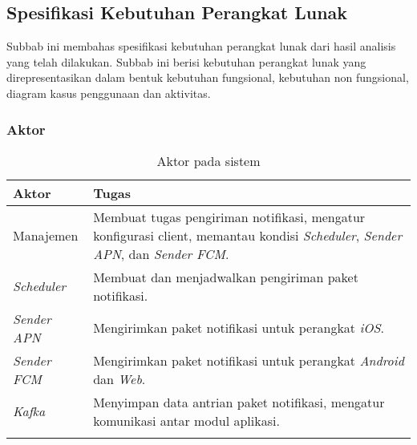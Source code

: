     \subsection{Spesifikasi Kebutuhan Perangkat Lunak}
    Subbab ini membahas spesifikasi kebutuhan perangkat lunak dari hasil analisis yang telah dilakukan. Subbab ini berisi kebutuhan perangkat lunak yang direpresentasikan dalam bentuk kebutuhan fungsional, kebutuhan non fungsional, diagram kasus penggunaan dan aktivitas.

        \subsubsection{Aktor}
        \begin{longtable}{|p{2cm}|p{6cm}|}
            \hline
            \textbf{Aktor} & \textbf{Tugas} \\
            \hline
            Manajemen &
            Membuat tugas pengiriman notifikasi, mengatur konfigurasi client, memantau kondisi \textit{Scheduler}, \textit{Sender APN}, dan \textit{Sender FCM}. \\
            \hline
            \textit{Scheduler} & Membuat dan menjadwalkan pengiriman paket notifikasi. \\
            \hline
            \textit{Sender APN} & Mengirimkan paket notifikasi untuk perangkat \textit{iOS}. \\
            \hline
            \textit{Sender FCM} & Mengirimkan paket notifikasi untuk perangkat \textit{Android} dan \textit{Web}. \\
            \hline
            \textit{Kafka} & Menyimpan data antrian paket notifikasi, mengatur komunikasi antar modul aplikasi. \\
            \hline
            \caption{Aktor pada sistem}
        \end{longtable}

